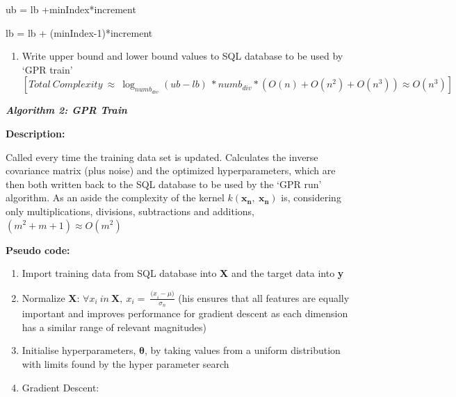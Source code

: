 \documentclass[10.5pt,a4paper,twoside]{report}   %
\begin{document}
 ub = lb +minIndex*increment

 lb = lb + (minIndex-1)*increment

\begin{enumerate}
\item  Write upper bound and lower bound values to SQL database to be used by `GPR train'
\[[Total\ Complexity\ \approx \ {{\log }_{numb_{div}} \left(ub-lb\right)\ }*nu{mb}_{div}*\left(O\left(n\right)+O\left(n^2\right)+O\left(n^3\right)\right)\approx O\left(n^3\right)]\] 
\end{enumerate}
\textbf{\textit{Algorithm 2: GPR Train}}

\noindent \textbf{Description:}

\noindent Called every time the training data set is updated. Calculates the inverse covariance matrix (plus noise) and the optimized hyperparameters, which are then both written back to the SQL database to be used by the `GPR run' algorithm.  As an aside the complexity of the kernel $k\left({{\mathbf x}}_{{\mathbf n}},\ {{\mathbf x}}_{{\mathbf n}}\right)$ is, considering only multiplications, divisions, subtractions and additions, $\left(m^2+m+1\right)\approx O(m^2)$

\noindent \textbf{Pseudo code:}

\begin{enumerate}
\item \textbf{ }Import training data from SQL database into \textbf{X} and the target data into \textbf{y}

\item  Normalize \textbf{X}: $\forall x_i\ in\ {\mathbf X}{\mathbf ,\ }x_i=\ \frac{{(x}_i-\mu )}{{\sigma }_n}$  (his ensures that all features are equally important and improves performance for gradient descent as each dimension has a similar range of relevant magnitudes) 

\item  Initialise hyperparameters, ${\mathbf \theta }$, by taking values from a uniform distribution with limits found by the hyper parameter search

\item  Gradient Descent:
\end{enumerate}
\end{document}
